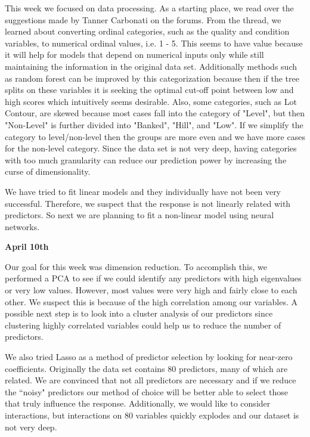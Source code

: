\documentclass[12pt]{article}
\begin{document}
This week we focused on data processing.  As a starting place, we read over the suggestions made by Tanner Carbonati on the forums.  From the thread, we learned about converting ordinal categories, such as the quality and condition variables, to numerical ordinal values, i.e. 1 - 5.  This seems to have value because it will help for models that depend on numerical inputs only while still maintaining the information in the original data set.  Additionally methods such as random forest can be improved by this categorization because then if the tree splits on these variables it is seeking the optimal cut-off point between low and high scores which intuitively seems desirable.  Also, some categories, such as Lot Contour, are skewed because most cases fall into the category of "Level", but then "Non-Level" is further divided into "Banked", "Hill", and "Low".  If we simplify the category to level/non-level then the groups are more even and we have more cases for the non-level category.  Since the data set is not very deep, having categories with too much granularity can reduce our prediction power by increasing the curse of dimensionality.  %

We have tried to fit linear models and they individually have not been very successful.  Therefore, we suspect that the response is not linearly related with predictors.  So next we are planning to fit a non-linear model using neural networks.

\textbf{April 10th}

Our goal for this week was dimension reduction.  To accomplish this, we performed a PCA to see if we could identify any predictors with high eigenvalues or very low values.  However, most values were very high and fairly close to each other.  We suspect this is because of the high correlation among our variables.  A possible next step is to look into a cluster analysis of our predictors since clustering highly correlated variables could help us to reduce the number of predictors.  %

We also tried Lasso as a method of predictor selection by looking for near-zero coefficients.  Originally the data set contains 80 predictors, many of which are related.  We are convinced that not all predictors are necessary and if we reduce the ``noisy" predictors our method of choice will be better able to select those that truly influence the response.  Additionally, we would like to consider interactions, but interactions on 80 variables quickly explodes and our dataset is not very deep.
\end{document}
